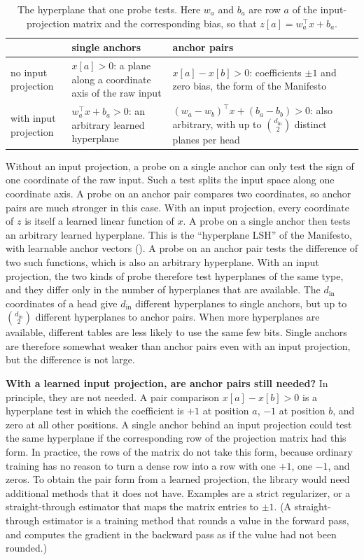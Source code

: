 \documentclass[11pt]{article}
\begin{document}
\begin{table}[htb]
\centering\small
\setlength{\tabcolsep}{8pt}
\begin{tabular}{L{34mm}L{52mm}L{58mm}}
\toprule
 & single anchors & anchor pairs \\
\midrule
no input projection & $x[a]>0$: a plane along a coordinate axis of the raw input & $x[a]-x[b]>0$: coefficients $\pm1$ and zero bias, the form of the Manifesto \\
with input projection & $w_a^\top x+b_a>0$: an arbitrary learned hyperplane & $(w_a-w_b)^\top x+(b_a-b_b)>0$: also arbitrary, with up to $\binom{d_\text{in}}{2}$ distinct planes per head \\
\bottomrule
\end{tabular}
\caption{The hyperplane that one probe tests. Here $w_a$ and $b_a$ are row $a$ of the input-projection
matrix and the corresponding bias, so that $z[a]=w_a^\top x+b_a$.}
\label{tab:planes}
\end{table}

Without an input projection, a probe on a single anchor can only test the sign of one coordinate of the
raw input. Such a test splits the input space along one coordinate axis. A probe on an anchor pair
compares two coordinates, so anchor pairs are much stronger in this case. With an input projection, every
coordinate of $z$ is itself a learned linear function of $x$. A probe on a single anchor then tests an
arbitrary learned hyperplane. This is the ``hyperplane LSH'' of the Manifesto, with learnable anchor
vectors (\citealp[Section VIII-H]{manifesto}). A probe on an anchor pair tests the difference of two such
functions, which is also an arbitrary hyperplane. With an input projection, the two kinds of probe
therefore test hyperplanes of the same type, and they differ only in the number of hyperplanes that are
available. The $d_\text{in}$ coordinates of a head give $d_\text{in}$ different hyperplanes to single
anchors, but up to $\binom{d_\text{in}}{2}$ different hyperplanes to anchor pairs. When more hyperplanes
are available, different tables are less likely to use the same few bits. Single anchors are therefore
somewhat weaker than anchor pairs even with an input projection, but the difference is not large.

\textbf{With a learned input projection, are anchor pairs still needed?} In principle, they are not
needed. A pair comparison $x[a]-x[b]>0$ is a hyperplane test in which the coefficient is $+1$ at position
$a$, $-1$ at position $b$, and zero at all other positions. A single anchor behind an input projection
could test the same hyperplane if the corresponding row of the projection matrix had this form. In
practice, the rows of the matrix do not take this form, because ordinary training has no reason to turn
a dense row into a row with one $+1$, one $-1$, and zeros. To obtain the pair form from a learned
projection, the library would need additional methods that it does not have. Examples are a strict
regularizer, or a straight-through estimator that maps the matrix entries to $\pm1$. (A straight-through
estimator is a training method that rounds a value in the forward pass, and computes the gradient in the
backward pass as if the value had not been rounded.)
\end{document}
